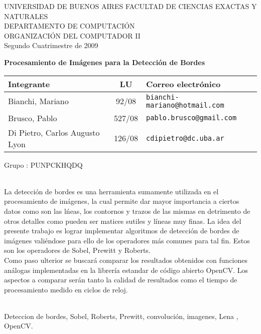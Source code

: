 \documentclass[11pt, a4paper]{article}
\begin{document}


\begin{center}


\LARGE{UNIVERSIDAD DE BUENOS AIRES}
\Large{FACULTAD DE CIENCIAS EXACTAS Y NATURALES\\
DEPARTAMENTO DE COMPUTACI\'ON\\
\vspace{1.5cm}
ORGANIZACI\'ON DEL COMPUTADOR II\\
Segundo Cuatrimestre de 2009}

\vskip 50pt
\textbf{\Large{Procesamiento de Im\'agenes para la Detecci\'on de Bordes}}

\end{center}

\vskip 30pt

\begin{center}
\begin{tabular}{|lcl|}
\hline Integrante & LU & Correo electr\'onico \\
\hline Bianchi, Mariano & 92/08 & \texttt{bianchi-mariano@hotmail.com}\\
Brusco, Pablo & 527/08 & \texttt{pablo.brusco@gmail.com} \\
Di Pietro, Carlos Augusto Lyon & 126/08 & \texttt{cdipietro@dc.uba.ar}\\
\hline
\end{tabular}

\vspace{20 pt}

Grupo : PUNPCKHQDQ

\end{center}

\vskip 60pt

{\small
{}\\
La detecci\'on de bordes es una herramienta sumamente utilizada en el procesamiento de im\'agenes, la cual permite dar mayor importancia a ciertos datos como son las l\'neas, los contornos y trazos de las mismas en detrimento de otros detalles como pueden ser matices sutiles y l\'ineas muy finas. La idea del presente trabajo es lograr implementar algoritmos de detecci\'on de bordes de im\'agenes vali\'endose para ello de los operadores m\'as comunes para tal fin. Estos son los operadores de Sobel, Prewitt y Roberts.\\
Como paso ulterior se buscar\'a comparar los resultados obtenidos con funciones an\'alogas implementadas en la librer\'ia estandar de c\'odigo abierto OpenCV. Los aspectos a comparar ser\'an tanto la calidad de resultados como el tiempo de
procesamiento medido en ciclos de reloj.\\

\vspace{22 pt}

\\
Deteccion de bordes, Sobel, Roberts, Prewitt, convoluci\'on, imagenes, Lena , OpenCV.
}
\end{document}
